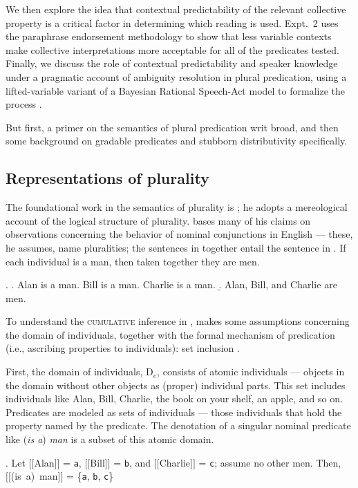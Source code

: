 \documentclass[linguex]{sp}
\newcommand{\sem}[1]{\mbox{$[\![$#1$]\!]$}}
\begin{document}
We then explore the idea that contextual predictability of the relevant collective property is a critical factor in determining which reading is used. Expt.~2 uses the paraphrase endorsement methodology to show that less variable contexts make collective interpretations more acceptable for all of the predicates tested. Finally, we discuss the role of contextual predictability and speaker knowledge under a pragmatic account of ambiguity resolution in plural predication, using a lifted-variable variant of a Bayesian Rational Speech-Act model to formalize the process \citep{frankgoodman2012,lassitergoodman2013}.

But first, a primer on the semantics of plural predication writ broad, and then some background on gradable predicates and stubborn distributivity specifically.

\subsection{Representations of plurality}

The foundational work in the semantics of plurality is \cite{link1983}; he adopts a mereological account of the logical structure of plurality. \citeauthor{link1983} bases many of his claims on observations concerning the behavior of nominal conjunctions in English --- these, he assumes, name pluralities; the sentences in \Next[a] together entail the sentence in \Next[b]. If each individual is a man, then taken together they are men.

\ex. \label{cumulative}\a. Alan is a man. Bill is a man. Charlie is a man.
\b. Alan, Bill, and Charlie are men.

To understand the \textsc{cumulative} inference in \Last, \citeauthor{link1983} makes some assumptions concerning the domain of individuals, together with the formal mechanism of predication (i.e., ascribing properties to individuals): set inclusion \citep[cf.][]{montague1973}.

First, the domain of individuals, D$_{e}$, consists of atomic individuals --- objects in the domain without other objects as (proper) individual parts. This set includes individuals like Alan, Bill, Charlie, the book on your shelf, an apple, and so on. Predicates are modeled as sets of individuals --- those individuals that hold the property named by the predicate. The denotation of a singular nominal predicate like (\emph{is a}) \emph{man} is a subset of this atomic domain.

\ex. \label{theboys} Let \sem{Alan} = \texttt{a}, \sem{Bill} = \texttt{b}, and \sem{Charlie} = \texttt{c}; assume no other men. Then,\\
 \sem{(is a) man} = \{\texttt{a}, \texttt{b}, \texttt{c}\}
\end{document}
